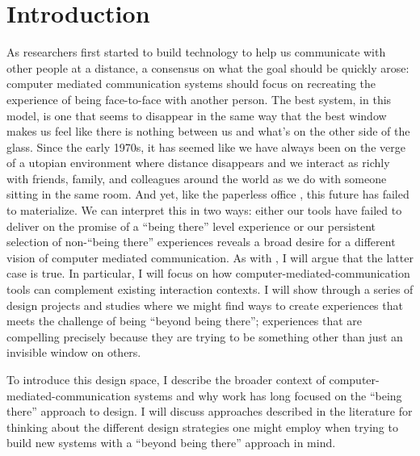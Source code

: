 \chapter{Introduction}



As researchers first started to build technology to help us communicate with other people at a distance, a consensus on what the goal should be quickly arose: computer mediated communication systems should focus on recreating the experience of being face-to-face with another person. The best system, in this model, is one that seems to disappear in the same way that the best window makes us feel like there is nothing between us and what's on the other side of the glass. Since the early 1970s, it has seemed like we have always been on the verge of a utopian environment where distance disappears and we interact as richly with friends, family, and colleagues around the world as we do with someone sitting in the same room. \citep{Egido:1988vq} And yet, like the paperless office \citep{Sellen:2001uk}, this future has failed to materialize. We can interpret this in two ways: either our tools have failed to deliver on the promise of a ``being there'' level experience or our persistent selection of non-``being there'' experiences reveals a broad desire for a different vision of computer mediated communication. As with \citet{Hollan:1992tz}, I will argue that the latter case is true. In particular, I will focus on how  computer-mediated-communication tools can complement existing interaction contexts. I will show through a series of design projects and studies where we might find ways to create experiences that meets the challenge of being ``beyond being there''; experiences that are compelling precisely because they are trying to be something other than just an invisible window on others.

To introduce this design space, I describe the broader context of computer-mediated-communication systems and why work has long focused on the ``being there'' approach to design. I will discuss approaches described in the literature for thinking about the different design strategies one might employ when trying to build new systems with a ``beyond being there'' approach in mind.


